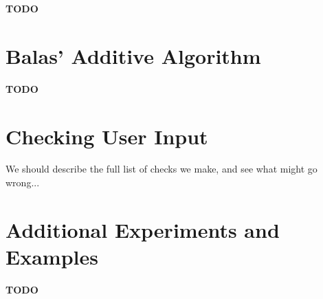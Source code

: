 \documentclass{article}
\begin{document}
{\bf TODO}

\section{Balas' Additive Algorithm}\label{app:balas}

{\bf TODO}

\section{Checking User Input}\label{app:input_check}

We should describe the full list of checks we make, and see what might go wrong...

\section{Additional Experiments and Examples}\label{app:additional_experiments_and_examples}

{\bf TODO}

\end{document}
